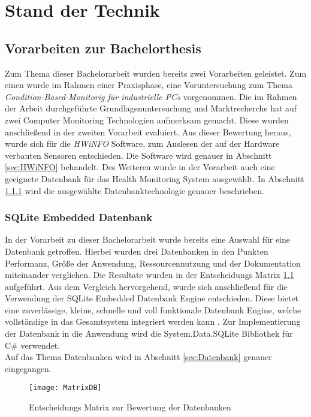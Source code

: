 \chapter{Stand der Technik}
\section{Vorarbeiten zur Bachelorthesis}
Zum Thema dieser Bachelorarbeit wurden bereits zwei Vorarbeiten geleistet. Zum einen wurde im Rahmen einer Praxisphase, eine Voruntersuchung zum Thema \textit{Condition-Based-Monitorig für industrielle PCs}  vorgenommen. Die im Rahmen der Arbeit \cite{PAMathias} durchgeführte Grundlagenuntersuchung und Marktrecherche hat auf zwei Computer Monitoring Technologien aufmerksam gemacht. Diese wurden anschließend in der zweiten Vorarbeit \cite{t3000} evaluiert. Aus dieser Bewertung heraus, wurde sich für die \textit{HWiNFO} Software, zum Auslesen der auf der Hardware verbauten Sensoren entschieden. Die Software wird genauer in Abschnitt \ref{sec:HWiNFO} behandelt. Des Weiteren wurde in der Vorarbeit \cite{t3000} auch eine geeignete Datenbank für das Health Monitoring System ausgewählt. In Abschnitt \ref{sec:SQLite} wird die ausgewählte Datenbanktechnologie genauer beschrieben. 

\subsection{SQLite Embedded Datenbank}\label{sec:SQLite}
In der Vorarbeit zu dieser Bachelorarbeit wurde bereits eine Auswahl für eine Datenbank getroffen. Hierbei wurden drei Datenbanken in den Punkten Performanz, Größe der Anwendung, Ressourcennutzung und der Dokumentation miteinander verglichen. Die Resultate wurden in der Entscheidungs Matrix \ref{fig:MatrixDB} aufgeführt. Aus dem Vergleich  hervorgehend, wurde sich anschließend für die Verwendung der SQLite Embedded Datenbank Engine entschieden. Diese bietet eine zuverlässige, kleine, schnelle und voll funktionale Datenbank Engine, welche vollständige in das Gesamtsystem integriert werden kann \cite{SQLiteHompage}. Zur Implementierung der Datenbank in die Anwendung wird die System.Data.SQLite Bibliothek für C\# verwendet.\\ 
Auf das Thema Datenbanken wird in Abschnitt \ref{sec:Datenbank} genauer eingegangen.
\begin{flushleft}
    \begin{figure}[h!]
        \centering
        \texttt{[image: MatrixDB]}
        \caption{Entscheidungs Matrix zur Bewertung der Datenbanken \cite{t3000}}
        \label{fig:MatrixDB}
    \end{figure}
\end{flushleft}
